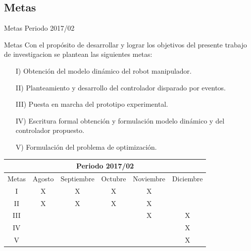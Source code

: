 {{{{\subsection{Metas} 
\begin{frame}[shrink=20]{Metas Periodo 2017/02}
	\begin{block}{Metas} 			
		\justifying	
		Con el propósito de desarrollar y lograr los objetivos del presente trabajo de investigacion se plantean las siguientes metas:	
		\begin{itemize}
			\item [I)] Obtención del modelo dinámico del robot manipulador.
			\item [II)] Planteamiento y desarrollo del controlador disparado por eventos.
			\item [III)] Puesta en marcha del prototipo experimental.
			\item [IV)] Escritura formal obtención y formulación modelo dinámico y del controlador propuesto.
			\item [V)] Formulación del problema de optimización.
		\end{itemize}
	\end{block}
	\begin{table}[H]
		\centering
		\begin{tabular}{|c|c|c|c|c|c|}
			\hline
			\multicolumn{6}{|c|}{Periodo 2017/02}\\\hline\hline
			Metas 	& Agosto 	& Septiembre 	& Octubre 	& Noviembre & Diciembre \\\hline
			I 		& X 		& X 			& X 		& X 		& 			\\\hline
			II		& X 		& X 			& X 		& X 		& 			\\\hline
			III		& 			&				&			& X			& X			\\\hline
			IV		&			&				&			&			& X			\\\hline
			V		&			&				&			&			& X			\\\hline
		\end{tabular}
		
	\end{table}
\end{frame}

}}}}

